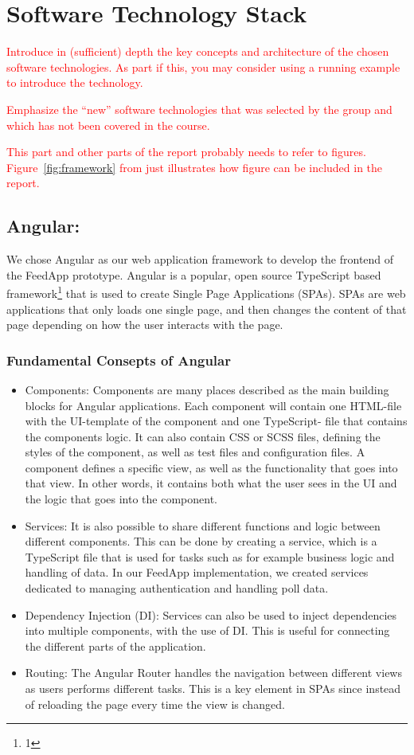 \section{Software Technology Stack}
\label{sec:technology}

\textcolor{red}{Introduce in (sufficient) depth the key concepts and architecture of the chosen software technologies. As part if this, you may consider using a running example to introduce the technology.}

\textcolor{red}{Emphasize the “new” software technologies that was selected by the group and which has not been covered in the course.}

\textcolor{red}{This part and other parts of the report probably needs to refer to
figures. Figure~\ref{fig:framework} from \cite{brown:96} just
illustrates how figure can be included in the report.}

\subsection{Angular:}
We chose Angular as our web application framework to develop the frontend of the FeedApp
prototype. Angular is a popular, open source TypeScript based framework\footnote{1} that is used to create
Single Page Applications (SPAs). SPAs are web applications that only loads one single page, and then
changes the content of that page depending on how the user interacts with the page.

\subsubsection{Fundamental Consepts of Angular }
\begin{itemize}
\item Components: Components are many places described as the main building blocks for Angular applications. Each
component will contain one HTML-file with the UI-template of the component and one TypeScript-
file that contains the components logic. It can also contain CSS or SCSS files, defining the styles of the
component, as well as test files and configuration files. A component defines a specific view, as well
as the functionality that goes into that view. In other words, it contains both what the user sees in
the UI and the logic that goes into the component.
\item Services: It is also possible to share different functions and logic between different components. This
can be done by creating a service, which is a TypeScript file that is used for tasks such as for example
business logic and handling of data. In our FeedApp implementation, we created services dedicated to managing authentication and handling poll data.
\item Dependency Injection (DI): Services can also be used to inject dependencies into multiple
components, with the use of DI. This is useful for connecting the different parts of the application.
\item Routing: The Angular Router handles the navigation between different views as users performs different tasks. This is a key element in SPAs since instead of reloading the page every time the view is changed.
\end{itemize}

